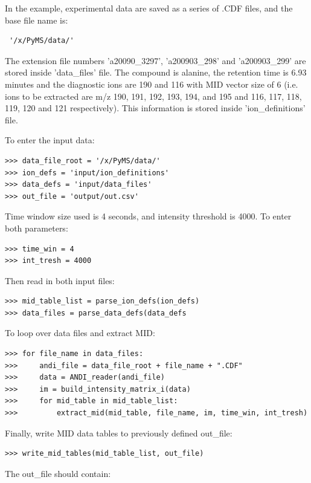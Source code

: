 In the example, experimental data are saved as a series of .CDF files, and the
base file name is:

\begin{verbatim}
 '/x/PyMS/data/'
\end{verbatim}

The extension file numbers 'a20090\_3297', 'a200903\_298' and 'a200903\_299' are
stored inside 'data\_files' file. The compound is alanine, the retention time
is 6.93 minutes and the diagnostic ions are 190 and 116 with MID vector size of
6 (i.e. ions to be extracted are m/z 190, 191, 192, 193, 194, and 195 and 116,
117, 118, 119, 120 and 121 respectively). This information is stored inside
'ion\_definitions' file.

To enter the input data:

\begin{verbatim}
>>> data_file_root = '/x/PyMS/data/'
>>> ion_defs = 'input/ion_definitions'
>>> data_defs = 'input/data_files'
>>> out_file = 'output/out.csv'
\end{verbatim}

Time window size used is 4 seconds, and intensity threshold is 4000. To enter 
both parameters:

\begin{verbatim} 
>>> time_win = 4 
>>> int_tresh = 4000 
\end{verbatim}

Then read in both input files:

\begin{verbatim}
>>> mid_table_list = parse_ion_defs(ion_defs)
>>> data_files = parse_data_defs(data_defs
\end{verbatim}

To loop over data files and extract MID:

\begin{verbatim}
>>> for file_name in data_files:
>>>     andi_file = data_file_root + file_name + ".CDF"
>>>     data = ANDI_reader(andi_file)
>>>     im = build_intensity_matrix_i(data)
>>>     for mid_table in mid_table_list:
>>>         extract_mid(mid_table, file_name, im, time_win, int_tresh)
\end{verbatim}

Finally, write MID data tables to previously defined out\_file:

\begin{verbatim}
>>> write_mid_tables(mid_table_list, out_file)
\end{verbatim}

The out\_file should contain:

